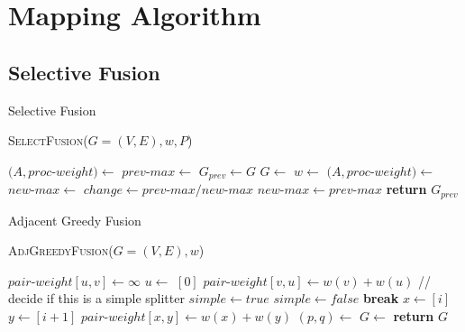 \section{Mapping Algorithm}

\subsection{Selective Fusion}
\begin{algorithm}
\caption{Selective Fusion} \label {alg:select_fus}
\textsc{SelectFusion}($G = (V, E), w, P$)
\begin{algorithmic}[1]
\State $(A, proc$-$weight) \gets $  
\State $prev$-$max \gets $ 
\Repeat
	\State $G_{prev} \gets G$
	\State $G \gets $ 
	\State $w \gets $ 
	\State $(A, proc$-$weight) \gets $ 
	\State $new$-$max \gets $ 
	\State $change \gets prev$-$max / new$-$max $
	\State $new$-$max \gets prev$-$max$
\State \textbf{return} $G_{prev}$
\end{algorithmic}
\end{algorithm}



\begin{algorithm}
\caption{Adjacent Greedy Fusion} \label {alg:adj_fus}
\textsc{AdjGreedyFusion}($G = (V, E), w$)
\begin{algorithmic}[1]
		\State $pair$-$weight[u,v] \gets \infty$
	\EndFor
\EndFor
{}
		\State $u \gets $ $[0]$
		\State $pair$-$weight[v,u] \gets w(v) + w(u)$
		\Statex // decide if this is a simple splitter
		\State $simple \gets true$			
				\State $simple \gets false$
				\State \textbf{break}
			\EndIf
		\EndFor
				\State $x \gets $$[i]$
				\State $y \gets $$[i + 1]$
				\State $pair$-$weight[x,y] \gets w(x) + w(y)$
			\EndFor 
		\EndIf
	\EndIf
\EndFor
\State $(p, q) \gets $ 
\State $G \gets $ 
\State \textbf{return} $G$
\end{algorithmic}
\end{algorithm}



